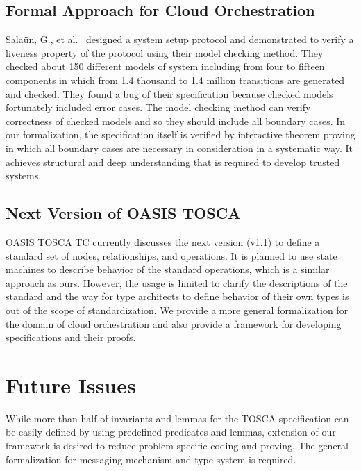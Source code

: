 \documentclass[12pt]{report}
\begin{document}
\subsection{Formal Approach for Cloud Orchestration}
Sala{\"u}n, G., et
al.~\cite{EtcheversCBP11,SalaunBCPEG13,SalaunEPBC13} designed a system
setup protocol and demonstrated to verify a liveness property of the
protocol using their model checking method. They checked about 150
different models of system including from four to fifteen components
in which from 1.4 thousand to 1.4 million transitions are generated
and checked. They found a bug of their specification because checked
models fortunately included error cases. The model checking method can
verify correctness of checked models and so they should include all
boundary cases. In our formalization, the specification itself is
verified by interactive theorem proving in which all boundary cases
are necessary in consideration in a systematic way. It achieves
structural and deep understanding that is required to develop trusted
systems.

\subsection{Next Version of OASIS TOSCA}
OASIS TOSCA TC currently discusses the next version (v1.1) to define a
standard set of nodes, relationships, and operations. It is planned to
use state machines to describe behavior of the standard operations,
which is a similar approach as ours. However, the usage is limited to
clarify the descriptions of the standard and the way for type
architects to define behavior of their own types is out of the scope
of standardization. We provide a more general formalization for the
domain of cloud orchestration and also provide a framework for developing
specifications and their proofs.

\section{Future Issues}
While more than half of invariants and lemmas for the TOSCA
specification can be easily defined by using predefined predicates and
lemmas, extension of our framework is desired to reduce problem
specific coding and proving. The general formalization for messaging
mechanism and type system is required.
\end{document}
